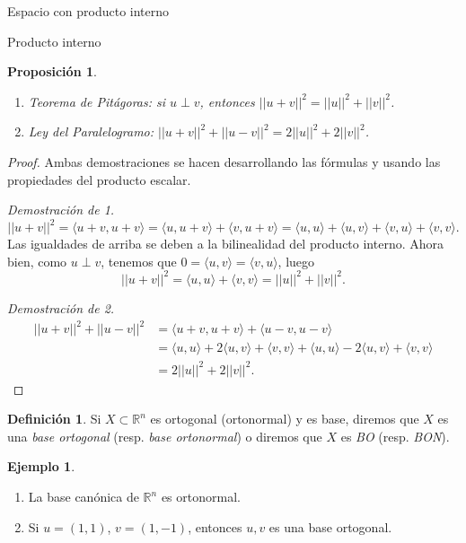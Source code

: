 \documentclass[a4paper,12pt,twoside,spanish]{amsbook}
\newtheorem{proposicion}[teorema]{Proposici\'on}
\theoremstyle{definition}
\newtheorem{definicion}{Definici\'on}[section]
\newtheorem{ejemplo}{Ejemplo}[section]
\theoremstyle{remark}
\newcommand{\la}{\langle}
\newcommand{\ra}{\rangle}
\newcommand{\R}{\mathbb R}
\begin{document}
\begin{chapter}{Espacio con producto interno}
\begin{section}{Producto interno}
		
		
		\begin{proposicion}
			${}^{}$
			\begin{enumerate}
				\item Teorema de Pitágoras: si $u\perp v$, entonces $||u+v||^2 = ||u||^2 + ||v||^2$.
				\item Ley del Paralelogramo: $||u+v||^2+ ||u-v||^2 = 2||u||^2 + 2||v||^2$.
			\end{enumerate}
		\end{proposicion}
		\begin{proof} Ambas demostraciones se hacen desarrollando las fórmulas y usando las propiedades del producto escalar.
			
			\textit{Demostración de 1.}
			\begin{equation*}
			||u+v||^2 = \la u+v, u+v\ra = \la u, u+v\ra+\la v, u+v\ra = \la u, u\ra+\la u, v\ra+\la v, u\ra+\la v, v\ra.
			\end{equation*} 
			Las igualdades de arriba se deben a la bilinealidad del producto interno. 
			Ahora bien,  como $u\perp v$,  tenemos que $0 = \la u, v\ra=\la v, u\ra$, luego
			\begin{equation*}
			||u+v||^2 = \la u, u\ra+ \la v, v\ra =  ||u||^2 + ||v||^2.
			\end{equation*} 
			
			\textit{Demostración de 2.}
			\begin{align*}
			||u+v||^2+ ||u-v||^2 &= \la u+v, u+v\ra + \la u-v, u-v\ra \\
			&= \la u, u\ra+2\la u, v\ra+\la v, v\ra + \la u, u\ra-2\la u, v\ra+\la v, v\ra \\
			&=  2||u||^2 + 2||v||^2.
			\end{align*}
		\end{proof}
		
		\begin{definicion} Si $X \subset \R^n$ es ortogonal (ortonormal) y es base, diremos que $X$ es una \emph{base ortogonal} (resp. \emph{base ortonormal}) o diremos que $X$ es \textit{BO} (resp. \textit{BON}).
		\end{definicion}
		
		\begin{ejemplo} ${}^{}$
			\begin{enumerate}
				\item La base canónica de $\R^n$ es ortonormal. 
				\item Si $u=(1,1)$, $v=(1,-1)$, entonces $u,v$ es una base ortogonal.  
			\end{enumerate}
		\end{ejemplo}
		

\end{section}
\end{chapter}
\end{document}
